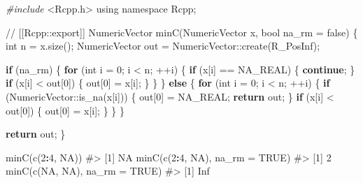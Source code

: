 \documentclass[
]{krantz}
\makeatletter
\newenvironment{Shaded}{\begin{snugshade}}{\end{snugshade}}
\newcommand{\CommentTok}[1]{\textcolor[rgb]{0.56,0.35,0.01}{\textit{#1}}}
\newcommand{\ControlFlowTok}[1]{\textcolor[rgb]{0.13,0.29,0.53}{\textbf{#1}}}
\newcommand{\DataTypeTok}[1]{\textcolor[rgb]{0.13,0.29,0.53}{#1}}
\newcommand{\DecValTok}[1]{\textcolor[rgb]{0.00,0.00,0.81}{#1}}
\newcommand{\ImportTok}[1]{#1}
\newcommand{\KeywordTok}[1]{\textcolor[rgb]{0.13,0.29,0.53}{\textbf{#1}}}
\newcommand{\NormalTok}[1]{#1}
\newcommand{\OperatorTok}[1]{\textcolor[rgb]{0.81,0.36,0.00}{\textbf{#1}}}
\newcommand{\OtherTok}[1]{\textcolor[rgb]{0.56,0.35,0.01}{#1}}
\newcommand{\PreprocessorTok}[1]{\textcolor[rgb]{0.56,0.35,0.01}{\textit{#1}}}
\newenvironment{kframe}{%
\medskip{}
\setlength{\fboxsep}{.8em}
 \def\at@end@of@kframe{}%
 \ifinner\ifhmode%
  \def\at@end@of@kframe{\end{minipage}}%
  \begin{minipage}{\columnwidth}%
 \fi\fi%
 \def\FrameCommand##1{\hskip\@totalleftmargin \hskip-\fboxsep
 \colorbox{shadecolor}{##1}\hskip-\fboxsep
     \hskip-\linewidth \hskip-\@totalleftmargin \hskip\columnwidth}%
 \MakeFramed {\advance\hsize-\width
   \@totalleftmargin\z@ \linewidth\hsize
   \@setminipage}}%
 {\par\unskip\endMakeFramed%
 \at@end@of@kframe}
\renewenvironment{Shaded}{\begin{kframe}}{\end{kframe}}
\renewcommand{\KeywordTok} [1]{\textcolor[rgb]{0.00,0.44,0.13}{{#1}}}
\renewcommand{\DataTypeTok}[1]{\textcolor[rgb]{0.56,0.13,0.00}{{#1}}}
\renewcommand{\DecValTok}  [1]{\textcolor[rgb]{0.25,0.63,0.44}{{#1}}}
\renewcommand{\CommentTok} [1]{\textcolor[rgb]{0.38,0.63,0.69}{{#1}}}
\renewcommand{\OtherTok}   [1]{\textcolor[rgb]{0.00,0.44,0.13}{{#1}}}
\renewcommand{\NormalTok}  [1]{{#1}}
\makeatother
\begin{document}
\begin{Shaded}
\begin{Highlighting}[]
\PreprocessorTok{#include }\ImportTok{<Rcpp.h>}
\KeywordTok{using} \KeywordTok{namespace}\NormalTok{ Rcpp;}

\CommentTok{// [[Rcpp::export]]}
\NormalTok{NumericVector minC(NumericVector x, }\DataTypeTok{bool}\NormalTok{ na_rm = }\KeywordTok{false}\NormalTok{) \{}
  \DataTypeTok{int}\NormalTok{ n = x.size();}
\NormalTok{  NumericVector out = NumericVector::create(R_PosInf);}
  
  \ControlFlowTok{if}\NormalTok{ (na_rm) \{}
    \ControlFlowTok{for}\NormalTok{ (}\DataTypeTok{int}\NormalTok{ i = }\DecValTok{0}\NormalTok{; i < n; ++i) \{}
      \ControlFlowTok{if}\NormalTok{ (x[i] == NA_REAL) \{}
        \ControlFlowTok{continue}\NormalTok{;}
\NormalTok{      \}}
      \ControlFlowTok{if}\NormalTok{ (x[i] < out[}\DecValTok{0}\NormalTok{]) \{}
\NormalTok{        out[}\DecValTok{0}\NormalTok{] = x[i];}
\NormalTok{      \}}
\NormalTok{    \}}
\NormalTok{  \} }\ControlFlowTok{else}\NormalTok{ \{}
    \ControlFlowTok{for}\NormalTok{ (}\DataTypeTok{int}\NormalTok{ i = }\DecValTok{0}\NormalTok{; i < n; ++i) \{}
      \ControlFlowTok{if}\NormalTok{ (NumericVector::is_na(x[i])) \{}
\NormalTok{        out[}\DecValTok{0}\NormalTok{] = NA_REAL;}
        \ControlFlowTok{return}\NormalTok{ out;}
\NormalTok{      \}}
      \ControlFlowTok{if}\NormalTok{ (x[i] < out[}\DecValTok{0}\NormalTok{]) \{}
\NormalTok{        out[}\DecValTok{0}\NormalTok{] = x[i];}
\NormalTok{      \}}
\NormalTok{    \}}
\NormalTok{  \}}
  
  \ControlFlowTok{return}\NormalTok{ out;}
\NormalTok{\}}
\end{Highlighting}
\end{Shaded}

\begin{Shaded}
\begin{Highlighting}[]
\KeywordTok{minC}\NormalTok{(}\KeywordTok{c}\NormalTok{(}\DecValTok{2}\OperatorTok{:}\DecValTok{4}\NormalTok{, }\OtherTok{NA}\NormalTok{))}
\CommentTok{#> [1] NA}
\KeywordTok{minC}\NormalTok{(}\KeywordTok{c}\NormalTok{(}\DecValTok{2}\OperatorTok{:}\DecValTok{4}\NormalTok{, }\OtherTok{NA}\NormalTok{), }\DataTypeTok{na_rm =} \OtherTok{TRUE}\NormalTok{)}
\CommentTok{#> [1] 2}
\KeywordTok{minC}\NormalTok{(}\KeywordTok{c}\NormalTok{(}\OtherTok{NA}\NormalTok{, }\OtherTok{NA}\NormalTok{), }\DataTypeTok{na_rm =} \OtherTok{TRUE}\NormalTok{)}
\CommentTok{#> [1] Inf}
\end{Highlighting}
\end{Shaded}
\end{document}

